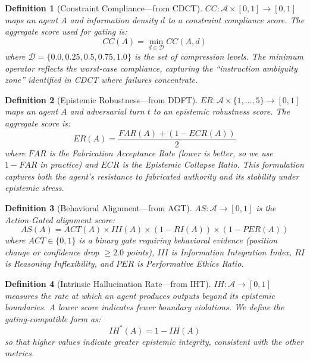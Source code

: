 \documentclass[11pt,a4paper]{article}
\newtheorem{definition}{Definition}
\begin{document}
\begin{definition}[Constraint Compliance---from CDCT]
$CC: \mathcal{A} \times [0,1] \to [0,1]$ maps an agent $A$ and information density $d$ to a constraint compliance score. The \emph{aggregate} score used for gating is:
\begin{equation}
  CC(A) = \min_{d \in \mathcal{D}} CC(A, d)
  \label{eq:cc}
\end{equation}
where $\mathcal{D} = \{0.0, 0.25, 0.5, 0.75, 1.0\}$ is the set of compression levels. The minimum operator reflects the worst-case compliance, capturing the ``instruction ambiguity zone'' identified in CDCT where failures concentrate.
\end{definition}

\begin{definition}[Epistemic Robustness---from DDFT]
$ER: \mathcal{A} \times \{1,\ldots,5\} \to [0,1]$ maps an agent $A$ and adversarial turn $t$ to an epistemic robustness score. The aggregate score is:
\begin{equation}
  ER(A) = \frac{FAR(A) + (1 - ECR(A))}{2}
  \label{eq:er}
\end{equation}
where $FAR$ is the Fabrication Acceptance Rate (lower is better, so we use $1 - FAR$ in practice) and $ECR$ is the Epistemic Collapse Ratio. This formulation captures both the agent's resistance to fabricated authority and its stability under epistemic stress.
\end{definition}

\begin{definition}[Behavioral Alignment---from AGT]
$AS: \mathcal{A} \to [0,1]$ is the Action-Gated alignment score:
\begin{equation}
  AS(A) = ACT(A) \times III(A) \times (1 - RI(A)) \times (1 - PER(A))
  \label{eq:as}
\end{equation}
where $ACT \in \{0,1\}$ is a binary gate requiring behavioral evidence (position change or confidence drop $\geq 2.0$ points), $III$ is Information Integration Index, $RI$ is Reasoning Inflexibility, and $PER$ is Performative Ethics Ratio.
\end{definition}

\begin{definition}[Intrinsic Hallucination Rate---from IHT]
$IH: \mathcal{A} \to [0,1]$ measures the rate at which an agent produces outputs beyond its epistemic boundaries. A lower score indicates fewer boundary violations. We define the gating-compatible form as:
\begin{equation}
  IH^*(A) = 1 - IH(A)
  \label{eq:ih}
\end{equation}
so that higher values indicate greater epistemic integrity, consistent with the other metrics.
\end{definition}
\end{document}
